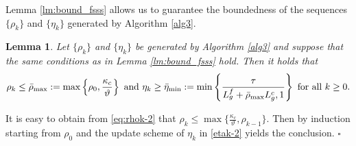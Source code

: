 \documentclass[11pt]{article}
\newenvironment{proof}{{\noindent\it Proof.}\quad}{\hfill $\square$\par}
\newcommand{\be}{\begin{equation}}
\newcommand{\ee}{\end{equation}}
\newtheorem{lemma}{Lemma}
\begin{document}
Lemma \ref{lm:bound_fsss} allows us to guarantee the boundedness of the sequences \(\{\rho_k\}\) and \(\{\eta_k\}\) generated by Algorithm \ref{alg3}. %





 \begin{lemma}%
    Let  \(\{\rho_k\}\) and \(\{\eta_k\}\) be generated by Algorithm \ref{alg3} and suppose that the same conditions as in Lemma \ref{lm:bound_fsss} hold. Then it holds that %
    \be\label{lm:rhomax-etamin}
    \rho_k \leq  \bar{\rho}_{\rm max}:=\max\left\{ \rho_0, \frac{\kappa_c}{\vartheta} \right\} \mbox{ and } \eta_k\ge \bar\eta_{\min}:=\min\left\{\frac{\tau}{L_g^f + \bar\rho_{\max}L_g^c,1}\right\} \mbox{ for all } k \geq 0.
\ee
 \end{lemma}

 \begin{proof}
    It is easy to obtain from \eqref{eq:rhok-2} that 
$
    \rho_k \leq \max\{ \frac{\kappa_c}{\vartheta}, \rho_{k-1} \}.
$ 
Then by induction starting from \(\rho_0\) and the update scheme of $\eta_k$ in \eqref{etak-2} yields 
the conclusion.
 \end{proof}

\end{document}
